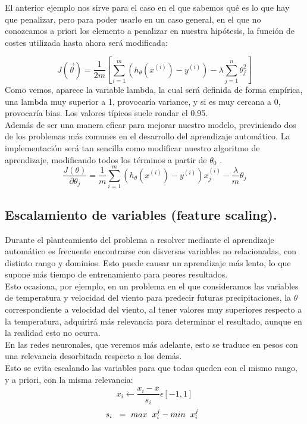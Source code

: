 \documentclass[a4paper,10pt]{article}
\begin{document}
El anterior ejemplo nos sirve para el caso en el que sabemos qué es lo que hay que penalizar, pero para poder usarlo en un caso general, en el que no conozcamos a priori los elemento a penalizar en nuestra hipótesis, la función de costes utilizada hasta ahora será modificada:

\[
J(\vec{\theta})=\frac{1}{2m}\left[\sum_{i=1}^{m} \left(h_\theta (x^{(i)})-y^{(i)}\right)-\lambda \sum_{j=1}^{n}\theta_{j}^2\right]
\]
Como vemos, aparece la variable lambda, la cual será definida de forma empírica, una lambda muy superior a 1, provocaría variance, y si es muy cercana a 0, provocaría bias. Los valores típicos suele rondar el 0,95.\\
Además de ser una manera eficar para mejorar nuestro modelo, previniendo dos de los problemas más comunes en el desarrollo del aprendizaje automático. La implementación será tan sencilla como modificar nuestro algoritmo de aprendizaje, modificando todos los términos a partir de $\theta_0$ .\\
\[
\frac{J(\theta)}{\partial\theta_j} = \frac{1}{m} \sum_{i=1}^{m} \left(h_\theta (x^{(i)})-y^{(i)}\right) x_{j}^{(i)}-\frac{\lambda}{m} \theta_j 
\]
\subsection{Escalamiento de variables (feature scaling).}
\noindent
Durante el planteamiento del problema a resolver mediante el aprendizaje automático es frecuente encontrarse con disversas variables no relacionadas, con distinto rango y dominios. Esto puede causar un aprendizaje más lento, lo que supone más tiempo de entrenamiento para peores resultados. \\
Esto ocasiona, por ejemplo, en un problema en el que consideramos las variables de temperatura y velocidad del viento para predecir futuras precipitaciones, la $\theta$ correspondiente a  velocidad del viento, al tener valores muy superiores respecto a la temperatura, adquirirá más relevancia para determinar el resultado, aunque en la realidad esto no ocurra.\\ En las redes neuronales, que veremos más adelante, esto se traduce en pesos con una relevancia desorbitada respecto a los demás.\\
Esto se evita escalando las variables para que todas queden con el mismo rango, y a priori, con la misma relevancia:
\[
x_i \longleftarrow \frac{x_i - \overline{x}}{s_i} \epsilon [-1,1]
\]
\hspace{0.20cm}
\[
s_i \hspace{0.20cm} = \  max\hspace{0.20cm}x_{i}^j -min\hspace{0.20cm}x_{i}^j \hspace{0.20cm}
\]
\newpage
\end{document}

